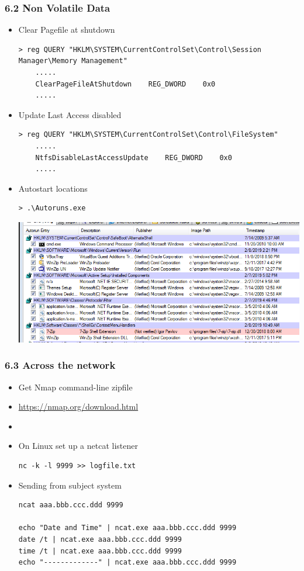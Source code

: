 \begin{frame}[fragile]
  \frametitle{6.2 Non Volatile Data}
  \begin{itemize}
        \item Clear Pagefile at shutdown
\begin{lstlisting}[basicstyle=\tiny]
> reg QUERY "HKLM\SYSTEM\CurrentControlSet\Control\Session Manager\Memory Management"
    .....
    ClearPageFileAtShutdown    REG_DWORD    0x0
    .....
\end{lstlisting}
        \item Update Last Access disabled
\begin{lstlisting}[basicstyle=\tiny]
> reg QUERY "HKLM\SYSTEM\CurrentControlSet\Control\FileSystem"
    .....
    NtfsDisableLastAccessUpdate    REG_DWORD    0x0
    .....
\end{lstlisting}
        \item Autostart locations
\begin{lstlisting}[basicstyle=\tiny]
> .\Autoruns.exe
\end{lstlisting}
\includegraphics[scale=.27]{images/f11_autorun.png}
  \end{itemize}
\end{frame}


\begin{frame}[fragile]
  \frametitle{6.3 Across the network}
  \begin{itemize}
        \item Get Nmap command-line zipfile
	\item[] \url{https://nmap.org/download.html}
	\item[]
        \item On Linux set up a netcat listener
\begin{lstlisting}[basicstyle=\tiny]
nc -k -l 9999 >> logfile.txt
\end{lstlisting}
        \item Sending from subject system
\begin{lstlisting}[basicstyle=\tiny]
ncat aaa.bbb.ccc.ddd 9999

echo "Date and Time" | ncat.exe aaa.bbb.ccc.ddd 9999
date /t | ncat.exe aaa.bbb.ccc.ddd 9999
time /t | ncat.exe aaa.bbb.ccc.ddd 9999
echo "-------------" | ncat.exe aaa.bbb.ccc.ddd 9999
\end{lstlisting}
  \end{itemize}
\end{frame}







